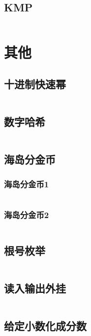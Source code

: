 \documentclass{article}
\begin{document}
\subsection{KMP}
\inputminted[breaklines]{c++}{../字符串/KMP.cpp}

\newpage
\section{其他}

\subsection{十进制快速幂}
\inputminted[breaklines]{c++}{../其他/十进制快速幂.cpp}

\subsection{数字哈希}
\inputminted[breaklines]{c++}{../其他/数字哈希.cpp}

\subsection{海岛分金币}
\subsubsection{海岛分金币1}
\inputminted[breaklines]{c++}{../其他/海岛分金币1.cpp}

\subsubsection{海岛分金币2}
\inputminted[breaklines]{c++}{../其他/海岛分金币2.cpp}

\subsection{根号枚举}
\inputminted[breaklines]{c++}{../其他/根号枚举.cpp}

\subsection{读入输出外挂}
\inputminted[breaklines]{c++}{../其他/读入输出外挂.cpp}

\subsection{给定小数化成分数}
\inputminted[breaklines]{python}{../其他/给定小数化成分数.py}

\end{document}
